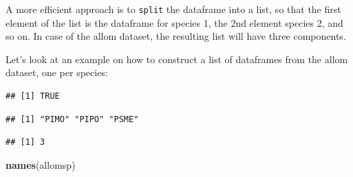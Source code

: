 \documentclass[]{book}
\newenvironment{Shaded}{\begin{snugshade}}{\end{snugshade}}
\newcommand{\CommentTok}[1]{\textcolor[rgb]{0.56,0.35,0.01}{\textit{#1}}}
\newcommand{\KeywordTok}[1]{\textcolor[rgb]{0.13,0.29,0.53}{\textbf{#1}}}
\newcommand{\NormalTok}[1]{#1}
\newcommand{\OperatorTok}[1]{\textcolor[rgb]{0.81,0.36,0.00}{\textbf{#1}}}
\newcommand{\StringTok}[1]{\textcolor[rgb]{0.31,0.60,0.02}{#1}}
\begin{document}
A more efficient approach is to \texttt{split} the dataframe into a list, so that the first element of the list is the dataframe for species 1, the 2nd element species 2, and so on. In case of the allom dataset, the resulting list will have three components.

Let's look at an example on how to construct a list of dataframes from the allom dataset, one per species:

\begin{Shaded}
\end{Shaded}

\begin{verbatim}
## [1] TRUE
\end{verbatim}

\begin{Shaded}
\end{Shaded}

\begin{verbatim}
## [1] "PIMO" "PIPO" "PSME"
\end{verbatim}

\begin{Shaded}
\end{Shaded}

\begin{verbatim}
## [1] 3
\end{verbatim}

\begin{Shaded}
\begin{Highlighting}[]
\KeywordTok{names}\NormalTok{(allomsp)}
\end{Highlighting}
\end{Shaded}
\end{document}
